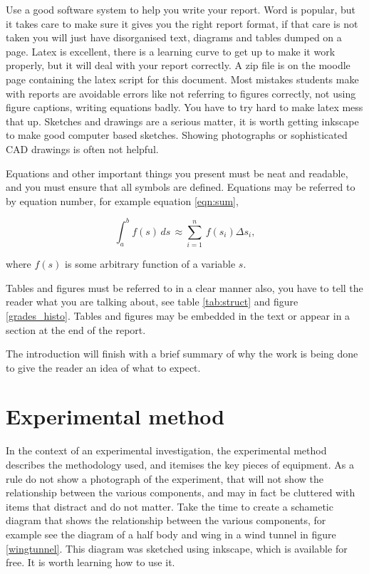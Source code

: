 \documentclass[11pt,a4]{article}
\begin{document}
Use a good software system to help you write your report. Word is popular, but it takes care to make sure it gives you the right report format, if that care is not taken you will just have disorganised text, diagrams and tables dumped on a page. Latex is excellent, there is a learning curve to get up to make it work properly, but it will deal with your report correctly. A zip file is on the moodle page containing the latex script for this document. Most mistakes students make with reports are avoidable errors like not referring to figures correctly, not using figure captions, writing equations badly. You have to try hard to make latex mess that up. Sketches and drawings are a serious matter, it is worth getting inkscape to make good computer based sketches. Showing photographs or sophisticated CAD drawings is often not helpful.

Equations and other important things you present must be neat and readable, and you must ensure that all symbols are defined. Equations may be referred to by equation number, for example equation \ref{eqn:sum},  

\begin{equation}
\label{eqn:sum}
\int_a^b f(s)\,ds\,\approx \sum_{i=1}^n\,f(s_i)\Delta s_i,
\end{equation}

where $f(s)$ is some arbitrary function of a variable $s$.

Tables and figures must be referred to  in a clear manner also, you have to tell the reader what you are talking about, see table \ref{tab:struct} and figure \ref{grades_histo}. Tables and figures may be embedded in the text or appear in a section at the end of the report.

The introduction will finish with a brief summary of why the work is being done to give the reader an idea of what to expect. 


\section{Experimental method}
In the context of an experimental investigation, the experimental method describes the methodology used, and itemises the key pieces of equipment. As a rule do not show a photograph of the experiment, that will not show the relationship between the various components, and may in fact be cluttered with items that distract and do not matter. Take the time to create a schametic diagram that shows the relationship between the various components, for example see the diagram of a half body and wing in a wind tunnel  in figure \ref{wingtunnel}. This diagram was sketched using inkscape, which is available for free. It is worth learning how to use it.
\end{document}
